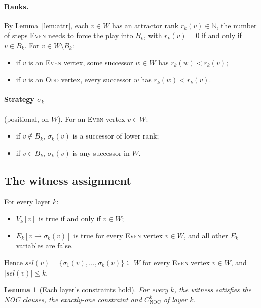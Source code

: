 \documentclass{article}
\newtheorem{lemma}{Lemma}
\theoremstyle{definition}
\theoremstyle{remark}
\newcommand{\Even}{\textsc{Even}}
\newcommand{\Odd}{\textsc{Odd}}
\newcommand{\sel}{\mathit{sel}}
\newcommand{\CNOC}{C_{\mathrm{NOC}}}
\begin{document}
\paragraph{Ranks.} By Lemma~\ref{lem:attr}, each $v \in W$ has an attractor
rank $r_k(v) \in \mathbb{N}$, the number of steps \Even{} needs to force the
play into $B_k$, with $r_k(v) = 0$ if and only if $v \in B_k$. For
$v \in W \setminus B_k$:
\begin{itemize}
  \item if $v$ is an \Even{} vertex, some successor $w \in W$ has
    $r_k(w) < r_k(v)$;
  \item if $v$ is an \Odd{} vertex, every successor $w$ has
    $r_k(w) < r_k(v)$.
\end{itemize}

\paragraph{Strategy $\sigma_k$} (positional, on $W$). For an \Even{} vertex
$v \in W$:
\begin{itemize}
  \item if $v \notin B_k$, $\sigma_k(v)$ is a successor of lower rank;
  \item if $v \in B_k$, $\sigma_k(v)$ is any successor in $W$.
\end{itemize}

\subsection*{The witness assignment}

For every layer $k$:
\begin{itemize}
  \item $V_k[v]$ is true if and only if $v \in W$;
  \item $E_k[v \to \sigma_k(v)]$ is true for every \Even{} vertex $v \in W$,
    and all other $E_k$ variables are false.
\end{itemize}
Hence $\sel(v) = \{\sigma_1(v), \dots, \sigma_k(v)\} \subseteq W$ for every
\Even{} vertex $v \in W$, and $|\sel(v)| \le k$.

\begin{lemma}[Each layer's constraints hold]\label{lem:layer}
For every $k$, the witness satisfies the NOC clauses, the exactly-one
constraint and $\CNOC^{k}$ of layer $k$.
\end{lemma}
\end{document}
